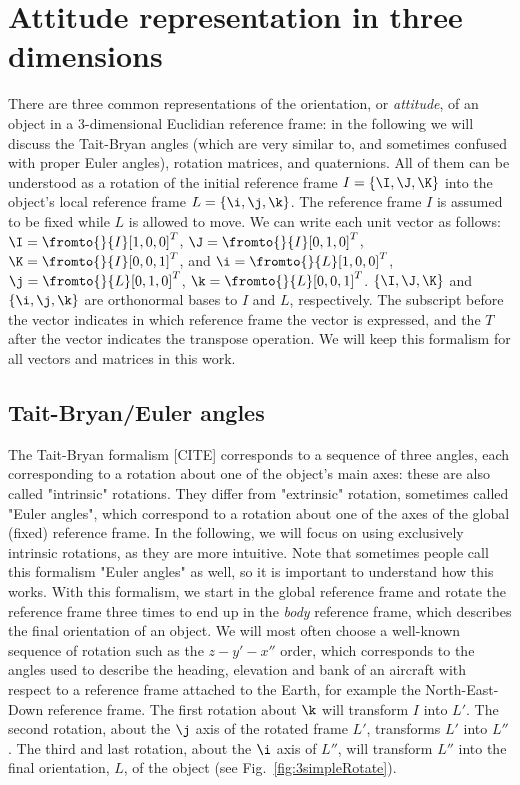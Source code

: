 \section{Attitude representation in three dimensions}
\label{sec:attituderepresentation}

There are three common representations of the orientation, or \textit{attitude}, of an object in a 3-dimensional Euclidian reference frame: in the following we will discuss the Tait-Bryan angles (which are very similar to, and sometimes confused with proper Euler angles), rotation matrices, and quaternions. All of them can be understood as a rotation of the initial reference frame $I = \{\I,\J,\K\}$ into the object's local reference frame $L = \{\i,\j,\k\}$. The reference frame $I$ is assumed to be fixed while $L$ is allowed to move. We can write each unit vector as follows: $\I = \fromto{}{I}[1,0,0]^T$, $\J = \fromto{}{I}[0,1,0]^T$, $\K = \fromto{}{I}[0,0,1]^T$, and $\i = \fromto{}{L}[1,0,0]^T$, $\j = \fromto{}{L}[0,1,0]^T$, $\k = \fromto{}{L}[0,0,1]^T$. $\{\I,\J,\K\}$ and $\{\i,\j,\k\}$ are  orthonormal bases to $I$ and $L$, respectively. The subscript before the vector indicates in which reference frame the vector is expressed, and the $T$ after the vector indicates the transpose operation. We will keep this formalism for all vectors and matrices in this work.

\subsection{Tait-Bryan/Euler angles}
\label{subsec:Tait-Bryan}
The Tait-Bryan formalism [CITE] corresponds to a sequence of three angles, each corresponding to a rotation about one of the object's main axes: these are also called "intrinsic" rotations. They differ from "extrinsic" rotation, sometimes called "Euler angles", which correspond to a rotation about one of the axes of the global (fixed) reference frame. In the following, we will focus on using exclusively intrinsic rotations, as they are more intuitive. Note that sometimes people call this formalism "Euler angles" as well, so it is important to understand how this works.
With this formalism, we start in the global reference frame and rotate the reference frame three times to end up in the 
\textit{body} reference frame, which describes the final orientation of an object. We will most often choose a well-known sequence of rotation such as the $z-y'-x''$ order, which corresponds to the angles used to describe the heading, elevation and bank of an aircraft with respect to a reference frame attached to the Earth, for example the North-East-Down reference frame. The first rotation about $\k$ will transform $I$ into $L'$. The second rotation, about the $\j$ axis of the rotated frame $L'$, transforms $L'$ into $L''$. The third and last rotation, about the $\i$ axis of $L''$, will transform $L''$ into the final orientation, $L$, of the object (see Fig.~\ref{fig:3simpleRotate}).

